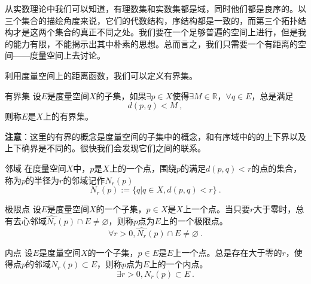 
\begin{issues}
\issueDraft
\issueTODO
\issueAbstract
{}
\end{issues}



从实数理论中我们可以知道，有理数集和实数集都是域，同时他们都是良序的。以三个集合的描绘角度来说，它们的代数结构，序结构都是一致的，而第三个拓扑结构才是这两个集合的真正不同之处。我们要在一个足够普遍的空间上进行，但是我的能力有限，不能揭示出其中朴素的思想。总而言之，我们只需要一个有距离的空间——度量空间上去讨论。

利用度量空间上的距离函数，我们可以定义有界集。

\begin{definition}{有界集}
设$E$是度量空间$X$的子集，如果$\exists{p}\in{X}$使得$\exists{M}\in{\mathbb{R}}$，$\forall{q}\in{E}$，总是满足
\[d(p,q)<M~,\]
则称$E$是$X$上的有界集。
\end{definition}

\textbf{注意}：这里的有界的概念是度量空间的子集中的概念，和有序域中的的上下界以及上下确界是不同的。很快我们会发现它们之间的联系。

\begin{definition}{邻域}
在度量空间$X$中，$p$是$X$上的一个点，围绕$p$的满足$d(p,q)<r$的点的集合，称为$p$的半径为$r$的邻域记作$N_r(p)$
\begin{equation}
N_r(p):=\{q|q\in{X},d(p,q)<r\}~.
\end{equation}
\end{definition}


\begin{definition}{极限点}\label{def_realat_2}
设$E$是度量空间$X$的一个子集，$p\in{X}$是$X$上一个点。当只要$r$大于零时，总有{\heiti 去心邻域}$\hat{N_r}(p)\cap{E}\not=\varnothing$，则称$p$点为$E$上的一个{\heiti 极限点}。
\begin{equation}
\forall{r>0},\hat{N_r}(p)\cap{E}\not=\varnothing~.
\end{equation}
\end{definition}



\begin{definition}{内点}\label{def_realat_1}
设$E$是度量空间$X$的一个子集，$p\in{E}$是$E$上一个点。总是存在大于零的$r$，使得点$p$的邻域$N_r(p)\subset{E}$，则称$p$点为$E$上的一个{\heiti 内点}。
\begin{equation}
\exists{r>0},N_r(p)\subset{E}~.
\end{equation}
\end{definition}

